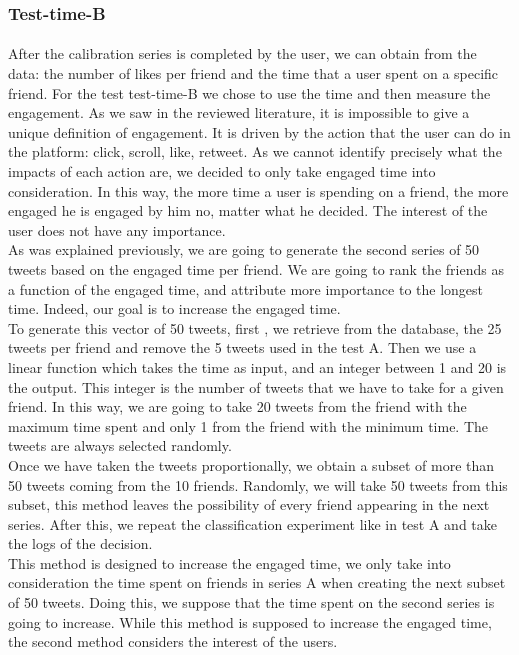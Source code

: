 \subsubsection{Test-time-B}

\paragraph{}
After the calibration series is completed by the user, we can obtain from the data: the number of likes per friend and the time that a user spent on a specific friend. For the test test-time-B we chose to use the time and then measure the engagement. As we saw in the reviewed literature, it is impossible to give a unique definition of engagement. It is driven by the action that the user can do in the platform: click, scroll, like, retweet. As we cannot identify precisely what the impacts of each action are, we decided to only take engaged time into consideration. In this way, the more time a user is spending on a friend, the more engaged he is engaged by him no, matter what he decided. The interest of the user does not have any importance. \\
As was explained previously, we are going to generate the second series of 50 tweets based on the engaged time per friend. We are going to rank the friends as a function of the engaged time, and attribute more importance to the longest time. Indeed, our goal is to increase the engaged time. \\
To generate this vector of 50 tweets, first , we retrieve from the database, the 25 tweets per friend and remove the 5 tweets used in the test A. Then we use a linear function which takes the time as input, and an integer between 1 and 20 is the output. This integer is the number of tweets that we have to take for a given friend. In this way, we are going to take 20 tweets from the friend with the maximum time spent and only 1 from the friend with the minimum time. The tweets are always selected randomly.\\
Once we have taken the tweets proportionally, we obtain a subset of more than 50 tweets coming from the 10 friends. Randomly, we will take 50 tweets from this subset, this method leaves the possibility of every friend appearing in the next series. After this, we repeat the classification experiment like in test A and take the logs of the decision.\\
This method is designed to increase the engaged time, we only take into consideration the time spent on friends in series A when creating the next subset of 50 tweets. Doing this, we suppose that the time spent on the second series is going to increase. While this method is supposed to increase the engaged time, the second method considers the interest of the users.



